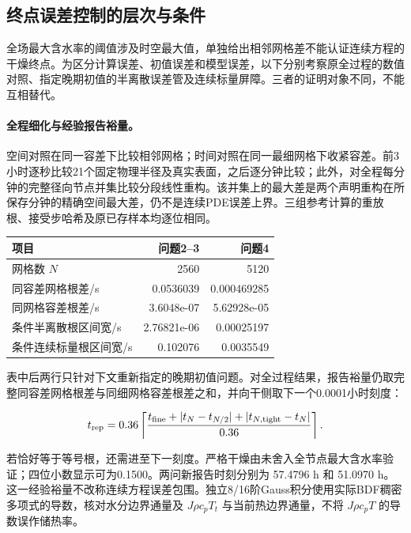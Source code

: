 \subsection{终点误差控制的层次与条件}

全场最大含水率的阈值涉及时空最大值，单独给出相邻网格差不能认证连续方程的干燥终点。为区分计算误差、初值误差和模型误差，以下分别考察原全过程的数值对照、指定晚期初值的半离散误差管及连续标量屏障。三者的证明对象不同，不能互相替代。

\paragraph{全程细化与经验报告裕量。}

空间对照在同一容差下比较相邻网格；时间对照在同一最细网格下收紧容差。前3小时逐秒比较21个固定物理半径及真实表面，之后逐分钟比较；此外，对全程每分钟的完整径向节点并集比较分段线性重构。该并集上的最大差是两个声明重构在所保存分钟的精确空间最大差，仍不是连续PDE误差上界。三组参考计算的重放根、接受步哈希及原已存样本均逐位相同。

\begin{center}\small\begin{tabular}{lrr}\hline 项目 & 问题2--3 & 问题4 \\\hline

网格数 $N$ & 2560 & 5120 \\

同容差网格根差/s & 0.0536039 & 0.000469285 \\

同网格容差根差/s & 3.6048e-07 & 5.62928e-05 \\

条件半离散根区间宽/s & 2.76821e-06 & 0.00025197 \\

条件连续标量根区间宽/s & 0.102076 & 0.0035549 \\

\hline\end{tabular}\end{center}

表中后两行只针对下文重新指定的晚期初值问题。对全过程结果，报告裕量仍取完整同容差网格根差与同细网格容差根差之和，并向干侧取下一个0.0001小时刻度：

\[t_{\rm rep}=0.36\left\lceil\frac{t_{\rm fine}+|t_{N}-t_{N/2}|+|t_{N,\rm tight}-t_{N}|}{0.36}\right\rceil .\]

若恰好等于等号根，还需进至下一刻度。严格干燥由未舍入全节点最大含水率验证；四位小数显示可为0.1500。两问新报告时刻分别为 57.4796 h 和 51.0970 h。这一经验裕量不改称连续方程误差包围。独立8/16阶Gauss积分使用实际BDF稠密多项式的导数，核对水分边界通量及 $J\rho c_pT_t$ 与当前热边界通量，不将 $J\rho c_pT$ 的导数误作储热率。

